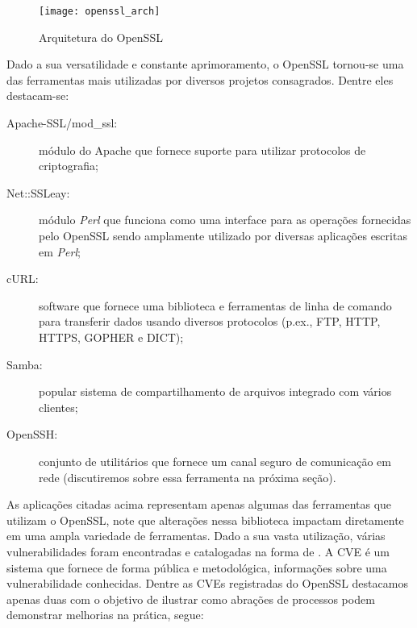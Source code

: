 \begin{figure}[!h]
  \centering
  \texttt{[image: openssl\_arch]}
  \caption[Arquitetura do OpenSSL]{Arquitetura do OpenSSL \citep{crypto_openssl}}
  \label{fig:openssl_arch}
\end{figure}

Dado a sua versatilidade e constante aprimoramento, o OpenSSL tornou-se uma das
ferramentas mais utilizadas por diversos projetos consagrados. Dentre eles
destacam-se:

\begin{description}
  \item [Apache-SSL/mod\_ssl:] módulo do Apache que fornece suporte para utilizar protocolos de criptografia;
  \item [Net::SSLeay:] módulo \emph{Perl} que funciona como uma interface para as operações fornecidas pelo OpenSSL sendo amplamente utilizado por diversas aplicações escritas em \emph{Perl};
  \item [cURL:] software que fornece uma biblioteca e ferramentas de linha de comando para transferir dados usando diversos protocolos (p.ex., FTP, HTTP, HTTPS, GOPHER e DICT); 
  \item [Samba:] popular sistema de compartilhamento de arquivos integrado com vários clientes;
  \item [OpenSSH:] conjunto de utilitários que fornece um canal seguro de comunicação em rede (discutiremos sobre essa ferramenta na próxima seção).
\end{description}

As aplicações citadas acima representam apenas algumas das ferramentas que
utilizam o OpenSSL, note que alterações nessa biblioteca impactam diretamente
em uma ampla variedade de ferramentas. Dado a sua vasta utilização, várias
vulnerabilidades foram encontradas e catalogadas na forma de . A CVE é
um sistema que fornece de forma pública e metodológica, informações sobre uma
vulnerabilidade conhecidas. Dentre as CVEs registradas do OpenSSL destacamos
apenas duas com o objetivo de ilustrar como abrações de processos podem
demonstrar melhorias na prática, segue:

